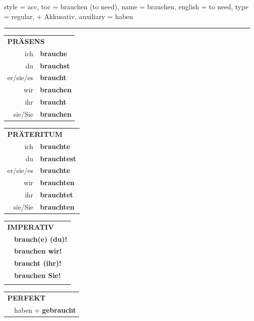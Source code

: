 \begin{verbentry}{
  style = {acc},
  toc = {brauchen (to need)},
  name = {brauchen},
  english = {to need},
  type = {regular, + Akkusativ},
  auxiliary = {haben}
}
 
    
     \vspace{5pt}

    \hrule
    
    \vspace{5pt}

  \begin{tabular}{rl}
     \multicolumn{2}{l}{\textbf{PRÄSENS} }\\
    ich & \textbf{brauche}\\
    du & \textbf{brauchst}\\
    er/sie/es & \textbf{braucht}\\
    wir & \textbf{brauchen}\\
    ihr & \textbf{braucht}\\
    sie/Sie & \textbf{brauchen}\\
  \end{tabular}
  \hfill
     \begin{tabular}{rl}
    \multicolumn{2}{l}{\textbf{PRÄTERITUM} }\\
    ich & \textbf{brauchte}\\
    du & \textbf{brauchtest}\\
    er/sie/es & \textbf{brauchte}\\
    wir & \textbf{brauchten}\\
    ihr & \textbf{brauchtet}\\
    sie/Sie & \textbf{brauchten}\\
  \end{tabular}
  \hfill
  \begin{tabular}{rl}
     \multicolumn{2}{l}{\textbf{IMPERATIV} }\\
   & \textbf{brauch(e) (du)!}\\
   & \textbf{brauchen wir!}\\
   & \textbf{braucht (ihr)!}\\
   & \textbf{brauchen Sie!}\\
   & \vspace{10pt}
  \end{tabular}

    \vspace{10pt}

 \begin{tabular}{rl}
     \multicolumn{2}{l}{\textbf{PERFEKT}}\\
   & haben + \textbf{gebraucht}\\
  \end{tabular}
\hfill
   \begin{tabular}{rl}
   

\end{tabular}
\end{verbentry}
